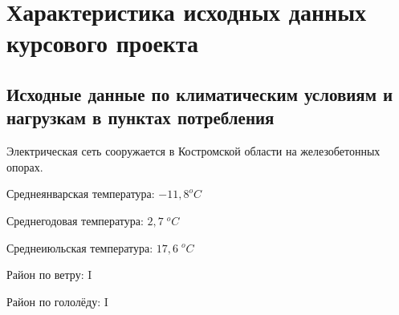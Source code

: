 \chapter{Характеристика исходных данных курсового проекта}
\label{cha:ish_dannie}

\section{Исходные данные по климатическим условиям и нагрузкам в пунктах потребления}

Электрическая сеть сооружается в Костромской области на железобетонных опорах.

Среднеянварская температура: \(-11,8 ^oC\)

Среднегодовая температура: \(2,7\; ^oC\)

Среднеиюльская температура: \(17,6\; ^oC\)

Район по ветру: I

Район по гололёду: I

